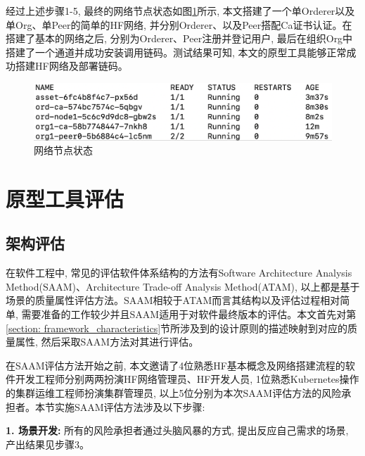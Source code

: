 经过上述步骤1-5, 最终的网络节点状态如图\ref{fabric_result}所示, 本文搭建了一个单Orderer以及单Org、单Peer的简单的HF网络, 并分别Orderer、以及Peer搭配Ca证书认证。在搭建了基本的网络之后, 分别为Orderer、Peer注册并登记用户, 最后在组织Org中搭建了一个通道并成功安装调用链码。测试结果可知, 本文的原型工具能够正常成功搭建HF网络及部署链码。


\begin{figure}[h] %
    \centering %
    \includegraphics[width=1.0\textwidth]{FIGs/chapter5/fabric_result.png} %
    \caption{网络节点状态} %
    \label{fabric_result} %
\end{figure}%

\section{原型工具评估}

\subsection{架构评估}

在软件工程中, 常见的评估软件体系结构的方法有Software Architecture Analysis Method(SAAM)、Architecture Trade-off Analysis Method(ATAM), 以上都是基于场景的质量属性评估方法\cite{ionita2002scenario}。SAAM相较于ATAM而言其结构以及评估过程相对简单, 需要准备的工作较少并且SAAM适用于对软件最终版本的评估\cite{huhonglei2004}。本文首先对第\ref{section: framework_characteristics}节所涉及到的设计原则的描述映射到对应的质量属性, 然后采取SAAM方法对其进行评估。

在SAAM评估方法开始之前, 本文邀请了4位熟悉HF基本概念及网络搭建流程的软件开发工程师分别两两扮演HF网络管理员、HF开发人员, 1位熟悉Kubernetes操作的集群运维工程师扮演集群管理员, 以上5位分别为本次SAAM评估方法的风险承担者。本节实施SAAM评估方法涉及以下步骤:

\textbf{1. 场景开发: }所有的风险承担者通过头脑风暴的方式, 提出反应自己需求的场景, 产出结果见步骤3。

